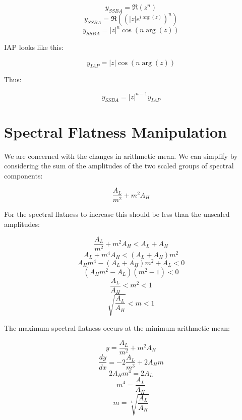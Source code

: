 \documentclass[a4paper]{article}
\begin{document}
	\[ y_{SSBA} = \Re \left( z^{n} \right) \]
	\[ y_{SSBA} = \Re \left( (|z|e^{i\arg(z)})^{n} \right) \]
	\[ y_{SSBA} = |z|^{n}\cos(n\arg(z)) \]

	IAP looks like this:

	\[ y_{IAP} = |z|\cos(n\arg(z)) \]

	Thus:

	\[ \boxed{y_{SSBA} = |z|^{n-1}y_{IAP}} \]

\section{Spectral Flatness Manipulation}
	We are concerned with the changes in arithmetic mean. We can simplify by considering the sum of the amplitudes of
	the two scaled groups of spectral components:

	\[ \frac{A_{L}}{m^{2}} + m^{2}A_{H} \]

	For the spectral flatness to increase this should be less than the unscaled amplitudes:

	\[ \frac{A_{L}}{m^{2}} + m^{2}A_{H} < A_{L} + A_{H} \]
	\[ A_{L} + m^{4}A_{H} < (A_{L} + A_{H})m^{2} \]
	\[ A_{H}m^{4} - (A_{L} + A_{H})m^{2} + A_{L} < 0 \]
	\[ (A_{H}m^{2} - A_{L})(m^{2} - 1) < 0 \]
	\[ \frac{A_{L}}{A_{H}} < m^{2} < 1 \]
	\[ \boxed{\sqrt{\frac{A_{L}}{A_{H}}} < m < 1} \]

	The maximum spectral flatness occurs at the minimum arithmetic mean:

	\[ y = \frac{A_{L}}{m^{2}} + m^{2}A_{H} \]
	\[ \frac{dy}{dx} = -2\frac{A_{L}}{m^{3}} + 2A_{H}m \]
	\[ 2A_{H}m^{4} = 2A_{L} \]
	\[ m^{4} = \frac{A_{L}}{A_{H}} \]
	\[ \boxed{m = \sqrt[4]{\frac{A_{L}}{A_{H}}}} \]
\end{document}
